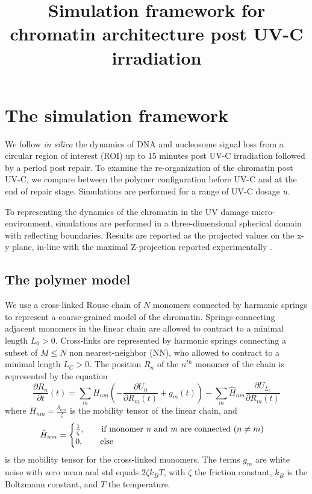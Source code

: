 \documentclass[12pt]{article}
\begin{document}
	
	\title{Simulation framework for chromatin architecture post UV-C irradiation}
\maketitle
\section{The simulation framework}
	We follow \textit{in silico} the dynamics of DNA and nucleosome signal loss from a circular region of interest (ROI) up to 15 minutes post UV-C irradiation followed by a period post repair. To examine the re-organization of the chromatin post UV-C, we compare between the polymer configuration before UV-C and at the end of repair stage. Simulations are performed for a range of UV-C dosage $u$.  
	
	To representing the dynamics of the chromatin in the UV damage micro-environment, simulations are performed in a three-dimensional spherical domain with reflecting boundaries. Results are reported as the projected values on the x-y plane, in-line with the maximal Z-projection reported experimentally \cite{adam2015imaging}. 
	
	\subsection{The polymer model}
	We use a cross-linked Rouse chain of $N$ monomers connected by harmonic springs \cite{doi1988theory} to represent a coarse-grained model of the chromatin. Springs connecting adjacent monomers in the linear chain are allowed to contract to a minimal length $L_0>0$. Cross-links are represented by harmonic springs connecting a subset of $M\leq N$ non nearest-neighbor (NN), who allowed to contract to a minimal length $L_C>0$. 
	The position $R_n$ of the $n^{th}$ monomer of the chain is  represented by the equation 
	\begin{equation}
	\frac{\partial R_n}{\partial t}(t) = \sum_m H_{nm}\left(-\frac{\partial U_0}{\partial R_m(t)}+g_m(t)\right) -\sum_m \hat{H}_{nm}\frac{\partial U_{L_c}}{\partial R_m (t)}
	\end{equation}
	where $H_{nm}=\frac{\delta_{nm}}{\zeta}$ is the mobility tensor of the linear chain, and 	
	\begin{equation}
	\hat{H}_{nm}= \begin{cases}
	\frac{1}{\zeta},\qquad 
	\text{if monomer \textit{n} and \textit{m} are connected ($n\neq m$)}\\
	0,\qquad \text{else}
	\end{cases}
	\end{equation}
	is the mobility tensor for the cross-linked monomers. 
	The terms $g_m$ are white noise with zero mean and std equals $2\zeta k_BT$, with $\zeta$ the friction constant, $k_B$ is the Boltzmann constant, and $T$ the temperature.  
	
\end{document}
